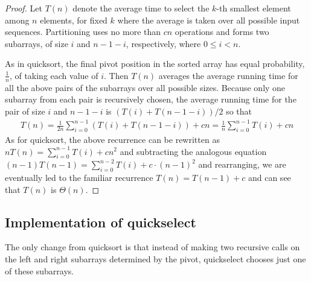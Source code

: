 \begin{proof}
Let $T(n)$ denote the average time to select the $k$-th smallest element among 
$n$ elements, for fixed $k$ where the average is taken over all possible input
sequences. Partitioning uses no more than $cn$ operations and forms two 
subarrays, of size $i$ and $n-1-i$, respectively, where \(0 \leq i < n\).

As in quicksort, the final pivot position in the sorted
array has equal probability, \(\frac{1}{n}\), of taking each value of $i$.
Then \(T(n)\) averages the average running time for all the above
pairs of the subarrays over all possible  sizes. Because only one subarray from 
each pair is recursively chosen, the average running time for the pair
of size $i$ and $n-1-i$ is \((T(i)+T(n-1-i))/2\) so that
\begin{eqnarray*}
T(n) 
= \frac{1}{2n} \sum\limits_{i=0}^{n-1}(T(i)+T(n-1-i)) + cn 
= \frac{1}{n} \sum\limits_{i=0}^{n-1}T(i)  + cn
\end{eqnarray*}
As for quicksort, the above recurrence can be rewritten as
\(
n T(n)  = \sum_{i=0}^{n-1}T(i) + cn^{2}
\) and subtracting the analogous equation
 $(n-1)T(n-1) = \sum_{i=0}^{n-2}T(i) + c \cdot (n-1)^{2}$ and rearranging,
we are eventually led to the familiar recurrence
\(
T(n) = T(n-1) + c
\) and can see that $T(n)$ is $\Theta(n)$.
\end{proof}

\subsection*{Implementation of quickselect}

The only change from quicksort is that instead of making two recursive calls on the
left and right subarrays determined by the pivot, quickselect chooses just one of 
these subarrays.

